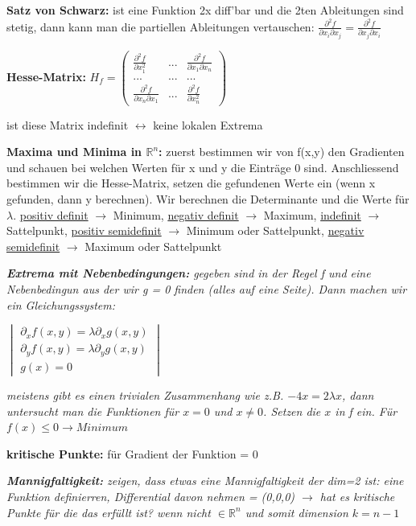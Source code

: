 \documentclass[a3paper, ngerman, 8pt]{article}
\begin{document}
\begin{multicols*}{3}
\textbf{Satz von Schwarz:} ist eine Funktion 2x diff'bar und die 2ten Ableitungen sind stetig, dann kann man die partiellen Ableitungen vertauschen: $\frac{\partial ^2 f}{\partial x_i \partial x_j}= \frac{\partial ^2 f}{\partial x_j \partial x_i}$

\textbf{Hesse-Matrix:} $H_f=\begin{pmatrix}
\frac{\partial ^2 f}{\partial x_1^2} & ... &\frac{\partial ^2 f}{\partial x_1 \partial x_n} \\
...& ... & ... \\
\frac{\partial ^2 f}{\partial x_n \partial x_1} & ... & \frac{\partial ^2 f}{\partial x_n^2}
\end{pmatrix}$ 

ist diese Matrix indefinit $\leftrightarrow$ keine lokalen Extrema

\textbf{Maxima und Minima in $\mathbb{R}^n$:} zuerst bestimmen wir von f(x,y) den Gradienten und schauen bei welchen Werten für x und y die Einträge 0 sind. Anschliessend bestimmen wir die Hesse-Matrix, setzen die gefundenen Werte ein (wenn x gefunden, dann y berechnen). Wir berechnen die Determinante und die Werte für $\lambda$. \underline{positiv definit} $\to$ Minimum, \underline{negativ definit} $\to$ Maximum, \underline{indefinit} $\to$ Sattelpunkt, \underline{positiv semidefinit} $\to$ Minimum oder  Sattelpunkt, \underline{negativ semidefinit} $\to$ Maximum oder  Sattelpunkt

\textit{\textbf{Extrema mit Nebenbedingungen:} gegeben sind in der Regel f und eine Nebenbedingun aus der wir g = 0 finden (alles auf eine Seite). Dann machen wir ein Gleichungssystem:}

$\begin{vmatrix}
\partial_xf(x,y) = \lambda \partial_x g(x,y) \\
\partial_yf(x,y) = \lambda \partial_y g(x,y)\\
g(x)=0
\end{vmatrix}$

\textit{meistens gibt es einen trivialen Zusammenhang wie z.B. $-4x=2\lambda x$, dann untersucht man die Funktionen für $x=0$ und $x\neq 0$. Setzen die $x$ in f ein. Für $f(x)\leq 0 \to Minimum$}

\textbf{kritische Punkte:} für Gradient der Funktion = $0$

\textit{\textbf{Mannigfaltigkeit:} zeigen, dass etwas eine Mannigfaltigkeit der dim=2 ist: eine Funktion definierren, Differential davon nehmen = (0,0,0) $\to$ hat es kritische Punkte für die das erfüllt ist? wenn nicht $\in \mathbb{R}^n$ und somit dimension $k=n-1$}


\end{multicols*}
\end{document}
